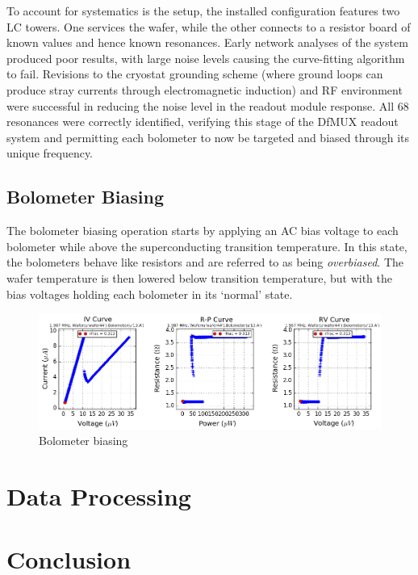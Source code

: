 \documentclass[iop]{emulateapj}
\begin{document}
To account for systematics is the setup, the installed configuration features two LC towers.  One services the wafer, while the other connects to a resistor board of known values and hence known resonances.  Early network analyses of the system produced poor results, with large noise levels causing the curve-fitting algorithm to fail.  Revisions to the cryostat grounding scheme (where ground loops can produce stray currents through electromagnetic induction) and RF environment were successful in reducing the noise level in the readout module response.  All 68 resonances were correctly identified, verifying this stage of the DfMUX readout system and permitting each bolometer to now be targeted and biased through its unique frequency.

\subsection{Bolometer Biasing}

The bolometer biasing operation starts by applying an AC bias voltage to each bolometer while above the superconducting transition temperature.  In this state, the bolometers behave like resistors and are referred to as being \textit{overbiased}.  The wafer temperature is then lowered below transition temperature, but with the bias voltages holding each bolometer in its `normal' state.  

\begin{figure}
	\includegraphics[width=\textwidth]{bolometer_bias}
	\centering
	\caption{Bolometer biasing}
	\label{bias}
\end{figure}

\section{Data Processing}
\label{data_section}

\section{Conclusion}
\end{document}
